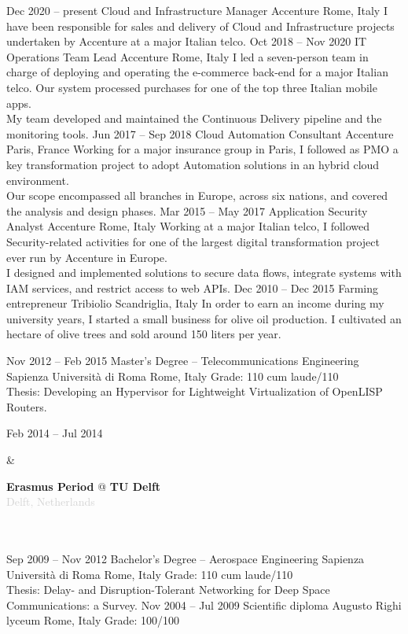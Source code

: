 \documentclass[9pt]{developercv}
\begin{document}
\begin{entrylist}
	\entry
		{Dec 2020 -- present}
		{Cloud and Infrastructure Manager}
		{Accenture}
		{Rome, Italy}
		{
			I have been responsible for sales and delivery of Cloud and Infrastructure projects undertaken by Accenture at a major Italian telco.
		}
	\entry
		{Oct 2018 -- Nov 2020}
		{IT Operations Team Lead}
		{Accenture}
		{Rome, Italy}
		{
			I led a seven-person team in charge of deploying and operating the e-commerce back-end for a major Italian telco. Our system processed purchases for one of the top three Italian mobile apps.
			\\
			My team developed and maintained the Continuous Delivery pipeline and the monitoring tools.
		}
	\entry
		{Jun 2017 -- Sep 2018}
		{Cloud Automation Consultant}
		{Accenture}
		{Paris, France}
		{
			Working for a major insurance group in Paris, I followed as PMO a key transformation project to adopt Automation solutions in an hybrid cloud environment.
			\\
			Our scope encompassed all branches in Europe, across six nations, and covered the analysis and design phases.
		}
	\entry
		{Mar 2015 -- May 2017}
		{Application Security Analyst}
		{Accenture}
		{Rome, Italy}
		{
			Working at a major Italian telco, I followed Security-related activities for one of the largest digital transformation project ever run by Accenture in Europe.
			\\
			I designed and implemented solutions to secure data flows, integrate systems with IAM services, and restrict access to web APIs.
		}
	\entry
		{Dec 2010 -- Dec 2015}
		{Farming entrepreneur}
		{Tribiolio}
		{Scandriglia, Italy}
		{
			In order to earn an income during my university years, I started a small business for olive oil production. I cultivated an hectare of olive trees and sold around 150 liters per year.
		}
\end{entrylist}


\begin{entrylist}
	\entry
		{Nov 2012 -- Feb 2015}
		{Master’s Degree -- Telecommunications Engineering}
		{Sapienza Università di Roma}
		{Rome, Italy}
		{
			Grade: 110 cum laude/110
			\\
			Thesis: Developing an Hypervisor for Lightweight Virtualization of OpenLISP Routers.
		}
		\parbox[t]{0.2\textwidth}{
			Feb 2014 -- Jul 2014
		}
		&\parbox[t]{0.8\textwidth}{
			\textbf{Erasmus Period} @ \textbf{TU Delft}
			\\
			\textcolor{lightgrey}{Delft, Netherlands}
		}\\\\
	\entry
		{Sep 2009 -- Nov 2012}
		{Bachelor’s Degree -- Aerospace Engineering}
		{Sapienza Università di Roma}
		{Rome, Italy}
		{
			Grade: 110 cum laude/110
			\\
			Thesis: Delay- and Disruption-Tolerant Networking for Deep Space Communications: a Survey.
		}
	\entry
		{Nov 2004 -- Jul 2009}
		{Scientific diploma}
		{Augusto Righi lyceum}
		{Rome, Italy}
		{Grade: 100/100}
\end{entrylist}
\end{document}
